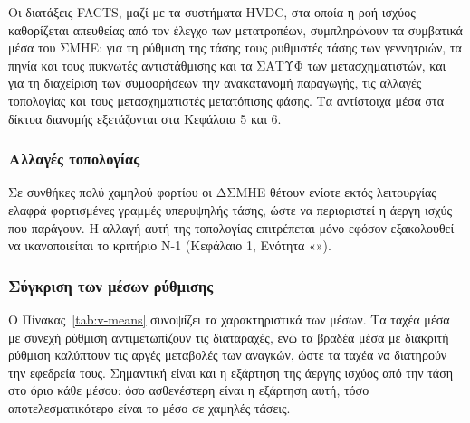 Οι διατάξεις FACTS, μαζί με τα συστήματα HVDC, στα οποία η ροή ισχύος καθορίζεται απευθείας από τον έλεγχο των
μετατροπέων, συμπληρώνουν τα συμβατικά μέσα του ΣΜΗΕ: για τη ρύθμιση της τάσης
τους ρυθμιστές τάσης των γεννητριών, τα πηνία και τους πυκνωτές αντιστάθμισης και τα
ΣΑΤΥΦ των μετασχηματιστών, και για τη διαχείριση των συμφορήσεων την ανακατανομή
παραγωγής, τις αλλαγές τοπολογίας και τους μετασχηματιστές μετατόπισης φάσης. Τα αντίστοιχα μέσα στα
δίκτυα διανομής εξετάζονται στα Κεφάλαια 5 και 6.

\subsubsection{Αλλαγές τοπολογίας}

Σε συνθήκες πολύ χαμηλού φορτίου οι ΔΣΜΗΕ θέτουν ενίοτε εκτός λειτουργίας ελαφρά φορτισμένες
γραμμές υπερυψηλής τάσης, ώστε να περιοριστεί η άεργη ισχύς που παράγουν. Η αλλαγή αυτή της
τοπολογίας επιτρέπεται μόνο εφόσον εξακολουθεί να
ικανοποιείται το κριτήριο N-1 (Κεφάλαιο 1, Ενότητα «»).

\subsubsection{Σύγκριση των μέσων ρύθμισης}

Ο Πίνακας~\ref{tab:v-means} συνοψίζει τα χαρακτηριστικά των μέσων. Τα ταχέα μέσα με συνεχή
ρύθμιση αντιμετωπίζουν τις διαταραχές, ενώ τα βραδέα μέσα με διακριτή ρύθμιση καλύπτουν τις
αργές μεταβολές των αναγκών, ώστε τα ταχέα να διατηρούν την εφεδρεία τους. Σημαντική είναι και
η εξάρτηση της άεργης ισχύος από την τάση στο όριο κάθε μέσου: όσο ασθενέστερη είναι η
εξάρτηση αυτή, τόσο αποτελεσματικότερο είναι το μέσο σε χαμηλές τάσεις.


